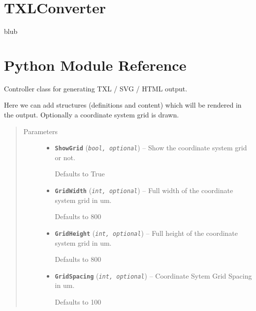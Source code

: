 \documentclass[letterpaper,10pt,english]{sphinxmanual}
\begin{document}
\chapter{TXLConverter}
\label{Chapters/30_TXLConverter:txlconverter}\label{Chapters/30_TXLConverter:sec-txlconverter}\label{Chapters/30_TXLConverter::doc}
blub


\chapter{Python Module Reference}
\label{Chapters/40_PythonModuleReference:python-module-reference}\label{Chapters/40_PythonModuleReference:module-TXLWizard.TXLWriter}\label{Chapters/40_PythonModuleReference::doc}

\begin{fulllineitems}
\label{Chapters/40_PythonModuleReference:TXLWizard.TXLWriter.TXLWriter}
Controller class for generating TXL / SVG / HTML output.

Here we can add structures (definitions and content) which will be rendered in the output.
Optionally a coordinate system grid is drawn.
\begin{quote}\begin{description}
\item[{Parameters}] \leavevmode\begin{itemize}
\item {} 
\textbf{\texttt{ShowGrid}} (\emph{\texttt{bool, optional}}) -- 
Show the coordinate system grid or not.

Defaults to True


\item {} 
\textbf{\texttt{GridWidth}} (\emph{\texttt{int, optional}}) -- 
Full width of the coordinate system grid in um.

Defaults to 800


\item {} 
\textbf{\texttt{GridHeight}} (\emph{\texttt{int, optional}}) -- 
Full height of the coordinate system grid in um.

Defaults to 800


\item {} 
\textbf{\texttt{GridSpacing}} (\emph{\texttt{int, optional}}) -- 
Coordinate Sytem Grid Spacing in um.

Defaults to 100



\end{itemize}
\end{description}
\end{quote}
\end{fulllineitems}
\end{document}

